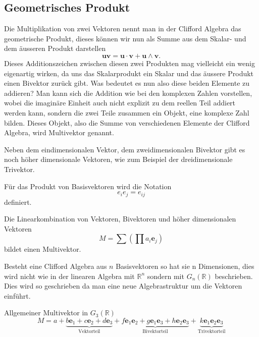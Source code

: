 \subsection{Geometrisches Produkt}
Die Multiplikation von zwei Vektoren nennt man in der Clifford Algebra das geometrische Produkt, dieses können wir nun als Summe aus dem Skalar- und dem äusseren Produkt darstellen
\begin{equation}
    \textbf{u}\textbf{v} = \textbf{u}\cdot \textbf{v} + \textbf{u} \wedge \textbf{v}.
\end{equation}
Dieses Additionszeichen zwischen diesen zwei Produkten mag vielleicht ein wenig eigenartig wirken, da uns das Skalarprodukt ein Skalar und das äussere Produkt einen Bivektor zurück gibt. Was bedeutet es nun also diese beiden Elemente zu addieren?
Man kann sich die Addition wie bei den komplexen Zahlen vorstellen, wobei die imaginäre Einheit auch nicht explizit zu dem reellen Teil addiert werden kann, sondern die zwei Teile zusammen ein Objekt, eine komplexe Zahl bilden. 
Dieses Objekt, also die Summe von verschiedenen Elemente der Clifford Algebra, wird Multivektor genannt.
\begin{definition}
Neben dem eindimensionalen Vektor, dem zweidimensionalen Bivektor gibt es noch höher dimensionale Vektoren, wie zum Beispiel der dreidimensionale Trivektor.
\end{definition}
\begin{definition}
	Für das Produkt von Basisvektoren wird die Notation
	\begin{equation}
		e_ie_j = e_{ij}
	\end{equation}
	 definiert.
\end{definition}
\begin{definition}
	Die Linearkombination von Vektoren, Bivektoren und höher dimensionalen Vektoren
	\begin{equation}
		M = \sum \left ( \prod a_i\textbf{e}_j \right )
	\end{equation}
  bildet einen Multivektor.
\end{definition}
Besteht eine Clifford Algebra aus $n$ Basisvektoren so hat sie n Dimensionen, dies wird nicht wie in der linearen Algebra mit $\mathbb{R}^n$ sondern mit $G_n(\mathbb{R})$ beschrieben. Dies wird so geschrieben da man eine neue Algebrastruktur um die Vektoren einführt.
\begin{beispiel}
Allgemeiner Multivektor in $G_3(\mathbb{R})$
\begin{equation}
    M = a 
    + 
    \underbrace{b\textbf{e}_1 + c\textbf{e}_2 + d\textbf{e}_3}_{\text{Vektorteil}} 
    +
    \underbrace{f\textbf{e}_1\textbf{e}_2 + g\textbf{e}_1\textbf{e}_3 + h\textbf{e}_2\textbf{e}_3 }_{\text{Bivektorteil}} 
    +   
    \underbrace{k\textbf{e}_1\textbf{e}_2\textbf{e}_3}_{\text{Trivektorteil}}
\end{equation}
\end{beispiel}
